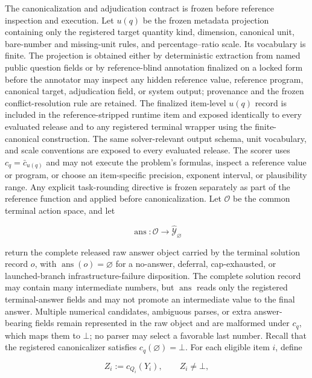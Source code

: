 \documentclass[10pt]{article} %
\providecommand{\1}{\mathbf{1}}  %
\theoremstyle{remark}
\theoremstyle{definition}
\begin{document}
The canonicalization and adjudication contract is frozen before reference inspection and execution. Let $u(q)$ be the frozen metadata projection containing only the registered target quantity kind, dimension, canonical unit, bare-number and missing-unit rules, and percentage--ratio scale. Its vocabulary is finite. The projection is obtained either by deterministic extraction from named public question fields or by reference-blind annotation finalized on a locked form before the annotator may inspect any hidden reference value, reference program, canonical target, adjudication field, or system output; provenance and the frozen conflict-resolution rule are retained. The finalized item-level $u(q)$ record is included in the reference-stripped runtime item and exposed identically to every evaluated release and to any registered terminal wrapper using the finite-canonical construction. The same solver-relevant output schema, unit vocabulary, and scale conventions are exposed to every evaluated release. The scorer uses $c_q=\bar c_{u(q)}$ and may not execute the problem's formulas, inspect a reference value or program, or choose an item-specific precision, exponent interval, or plausibility range. Any explicit task-rounding directive is frozen separately as part of the reference function and applied before canonicalization. Let $\mathcal O$ be the common terminal action space, and let

\begin{equation}
\operatorname{ans}:\mathcal O
\longrightarrow
\widehat{\mathcal Y}_{\varnothing}
\end{equation}

return the complete released raw answer object carried by the terminal solution record $o$, with $\operatorname{ans}(o)=\varnothing$ for a no-answer, deferral, cap-exhausted, or launched-branch infrastructure-failure disposition. The complete solution record may contain many intermediate numbers, but $\operatorname{ans}$ reads only the registered terminal-answer fields and may not promote an intermediate value to the final answer. Multiple numerical candidates, ambiguous parses, or extra answer-bearing fields remain represented in the raw object and are malformed under $c_q$, which maps them to $\bot$; no parser may select a favorable last number. Recall that the registered canonicalizer satisfies $c_q(\varnothing)=\bot$. For each eligible item $i$, define

\begin{equation}
Z_i:=c_{Q_i}(Y_i),
\qquad
Z_i\neq\bot,
\label{eq:pilot-canonical-target}
\end{equation}
\end{document}
